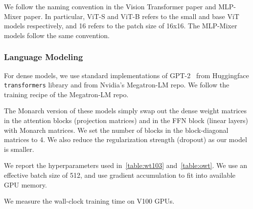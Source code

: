 We follow the naming convention in the Vision Transformer paper and MLP-Mixer paper. In particular, ViT-S and ViT-B refers to the small and base ViT models respectively, and 16 refers to the patch size of 16x16. The MLP-Mixer models follow the same convention.

\subsubsection{Language Modeling}
For dense models, we use standard implementations of
GPT-2~\citep{radford2019language} from Huggingface \texttt{transformers} library and from Nvidia's Megatron-LM repo. 
We follow the training recipe of the Megatron-LM repo.

The Monarch version of these models simply swap out the dense weight matrices in the attention blocks (projection matrices) and in the FFN block (linear layers) with Monarch matrices.
We set the number of blocks in the block-diagonal matrices to 4.
We also reduce the regularization strength (dropout) as our model is smaller.

We report the hyperparameters used in~\cref{table:wt103} and~\cref{table:owt}.
We use an effective batch size of 512, and use gradient accumulation to fit into available GPU memory.

We measure the wall-clock training time on V100 GPUs.
\begin{table}[!h]
    \vspace{-0.5cm}
\centering
\caption{Configuration of the WikiText-103 experiments}
\label{table:wt103}
\end{table}

